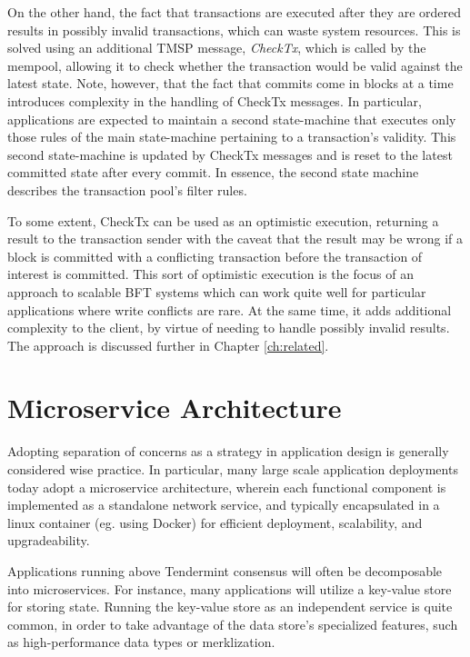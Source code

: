 On the other hand, the fact that transactions are executed after they are ordered results in possibly invalid transactions,
which can waste system resources. 
This is solved using an additional TMSP message, \emph{CheckTx}, which is called by the mempool,
allowing it to check whether the transaction would be valid against the latest state.
Note, however, that the fact that commits come in blocks at a time introduces complexity in the handling of CheckTx messages.
In particular, applications are expected to maintain a second state-machine that executes only those rules of the main state-machine pertaining to a transaction's validity. 
This second state-machine is updated by CheckTx messages and is reset to the latest committed state after every commit.
In essence, the second state machine describes the transaction pool's filter rules.

To some extent, CheckTx can be used as an optimistic execution, 
returning a result to the transaction sender with the caveat that the result may be wrong if a block is committed with a conflicting transaction
before the transaction of interest is committed.
This sort of optimistic execution is the focus of an approach to scalable BFT systems which can work quite well for particular applications where write conflicts
are rare. 
At the same time, it adds additional complexity to the client, by virtue of needing to handle possibly invalid results.
The approach is discussed further in Chapter \ref{ch:related}.

\section{Microservice Architecture}

Adopting separation of concerns as a strategy in application design is generally considered wise practice.
In particular, many large scale application deployments today adopt a microservice architecture,
wherein each functional component is implemented as a standalone network service, 
and typically encapsulated in a linux container (eg. using Docker) for efficient deployment, scalability, and upgradeability.

Applications running above Tendermint consensus will often be decomposable into microservices.
For instance, many applications will utilize a key-value store for storing state.
Running the key-value store as an independent service is quite common, 
in order to take advantage of the data store's specialized features, such as high-performance data types or merklization.

